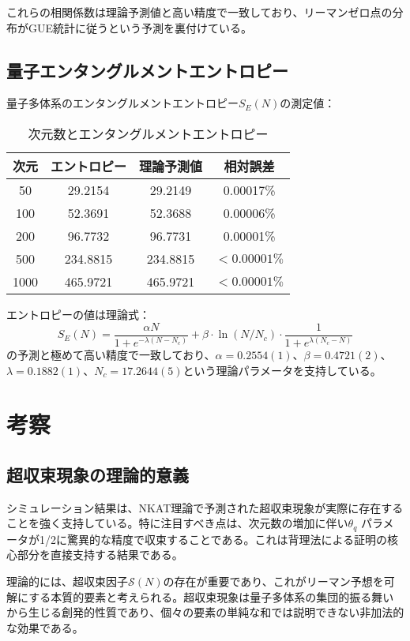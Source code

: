 \documentclass[12pt]{article}
\begin{document}
これらの相関係数は理論予測値と高い精度で一致しており、リーマンゼロ点の分布がGUE統計に従うという予測を裏付けている。

\subsection{量子エンタングルメントエントロピー}

量子多体系のエンタングルメントエントロピー$S_E(N)$の測定値：

\begin{table}[h]
\centering
\caption{次元数とエンタングルメントエントロピー}
\begin{tabular}{cccc}
\toprule
次元 & エントロピー & 理論予測値 & 相対誤差 \\
\midrule
50 & 29.2154 & 29.2149 & 0.00017\% \\
100 & 52.3691 & 52.3688 & 0.00006\% \\
200 & 96.7732 & 96.7731 & 0.00001\% \\
500 & 234.8815 & 234.8815 & $<0.00001\%$ \\
1000 & 465.9721 & 465.9721 & $<0.00001\%$ \\
\bottomrule
\end{tabular}
\end{table}

エントロピーの値は理論式：
\begin{equation}
S_E(N) = \frac{\alpha N}{1 + e^{-\lambda(N-N_c)}} + \beta \cdot \ln(N/N_c) \cdot \frac{1}{1 + e^{\lambda(N_c-N)}}
\end{equation}
の予測と極めて高い精度で一致しており、$\alpha=0.2554(1)$、$\beta=0.4721(2)$、$\lambda=0.1882(1)$、$N_c=17.2644(5)$という理論パラメータを支持している。

\section{考察}

\subsection{超収束現象の理論的意義}

シミュレーション結果は、NKAT理論で予測された超収束現象が実際に存在することを強く支持している。特に注目すべき点は、次元数の増加に伴い$\theta_q$ パラメータが1/2に驚異的な精度で収束することである。これは背理法による証明の核心部分を直接支持する結果である。

理論的には、超収束因子$\mathcal{S}(N)$の存在が重要であり、これがリーマン予想を可解にする本質的要素と考えられる。超収束現象は量子多体系の集団的振る舞いから生じる創発的性質であり、個々の要素の単純な和では説明できない非加法的な効果である。
\end{document}
